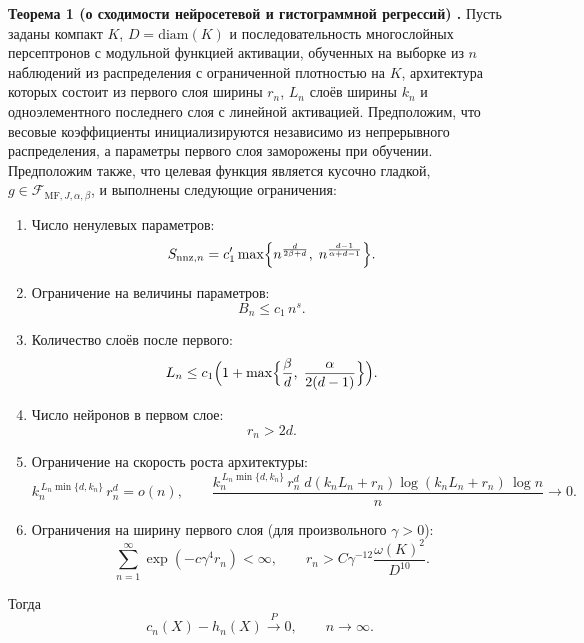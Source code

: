 \documentclass[12pt,a4paper]{article}
\begin{document}
\medskip
\noindent\textbf{Теорема 1 (о сходимости нейросетевой и гистограммной регрессий) \cite{eliseev2025}.}
Пусть заданы компакт $K$, $D=\mathrm{diam}(K)$ и последовательность многослойных
персептронов с модульной функцией активации, обученных на выборке из $n$ наблюдений из распределения
с ограниченной плотностью на $K$, архитектура которых состоит из первого слоя ширины $r_n$,
$L_n$ слоёв ширины $k_n$ и одноэлементного последнего слоя с линейной активацией. Предположим, что
весовые коэффициенты инициализируются независимо из непрерывного распределения,
а параметры первого слоя заморожены при обучении. Предположим также, что целевая функция является
кусочно гладкой, $g\in \mathcal{F}_{\mathrm{MF},J,\alpha,\beta}$, и выполнены следующие ограничения:
\begin{enumerate}[label=(\roman*),leftmargin=1.25cm]
\item Число ненулевых параметров:
\begin{equation}
S_{\mathrm{nnz},n}=c_1'\max\Bigl\{n^{\frac{d}{2\beta+d}},\;n^{\frac{d-1}{\alpha+d-1}}\Bigr\}.
\end{equation}
\item Ограничение на величины параметров:
\begin{equation}
B_n\le c_1\,n^{s}.
\end{equation}
\item Количество слоёв после первого:
\begin{equation}
L_n\le c_1\Bigl(1+\max\Bigl\{\frac{\beta}{d},\;\frac{\alpha}{2(d-1)}\Bigr\}\Bigr).
\end{equation}
\item Число нейронов в первом слое:
\begin{equation}
r_n>2d.
\end{equation}
\item Ограничение на скорость роста архитектуры:
\begin{equation}
k_n^{\,L_n\min\{d,k_n\}}\,r_n^{d}=o(n),\qquad
\frac{k_n^{\,L_n\min\{d,k_n\}}\,r_n^{d}\;d(k_nL_n+r_n)\log(k_nL_n+r_n)\,\log n}{n}\to 0.
\end{equation}
\item Ограничения на ширину первого слоя (для произвольного $\gamma>0$):
\begin{equation}
\sum_{n=1}^{\infty}\exp(-c\gamma^{4}r_n)<\infty,\qquad
r_n> C\gamma^{-12}\frac{\omega(K)^2}{D^{10}}.
\end{equation}
\end{enumerate}
Тогда
\begin{equation}
c_n(X)-h_n(X)\xrightarrow{P}0,\qquad n\to\infty.
\end{equation}
\end{document}
